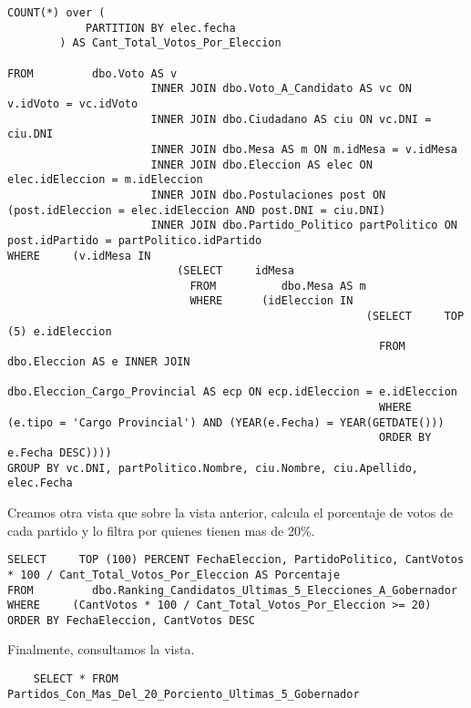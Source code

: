\begin{enumerate}
\begin{lstlisting}
COUNT(*) over (
	        PARTITION BY elec.fecha
	    ) AS Cant_Total_Votos_Por_Eleccion  

FROM         dbo.Voto AS v 
                      INNER JOIN dbo.Voto_A_Candidato AS vc ON v.idVoto = vc.idVoto 
                      INNER JOIN dbo.Ciudadano AS ciu ON vc.DNI = ciu.DNI 
                      INNER JOIN dbo.Mesa AS m ON m.idMesa = v.idMesa 
                      INNER JOIN dbo.Eleccion AS elec ON elec.idEleccion = m.idEleccion
                      INNER JOIN dbo.Postulaciones post ON (post.idEleccion = elec.idEleccion AND post.DNI = ciu.DNI)
                      INNER JOIN dbo.Partido_Politico partPolitico ON post.idPartido = partPolitico.idPartido
WHERE     (v.idMesa IN
                          (SELECT     idMesa
                            FROM          dbo.Mesa AS m
                            WHERE      (idEleccion IN
                                                       (SELECT     TOP (5) e.idEleccion
                                                         FROM          dbo.Eleccion AS e INNER JOIN
                                                                                dbo.Eleccion_Cargo_Provincial AS ecp ON ecp.idEleccion = e.idEleccion
                                                         WHERE      (e.tipo = 'Cargo Provincial') AND (YEAR(e.Fecha) = YEAR(GETDATE()))
                                                         ORDER BY e.Fecha DESC))))
GROUP BY vc.DNI, partPolitico.Nombre, ciu.Nombre, ciu.Apellido, elec.Fecha
\end{lstlisting}

Creamos otra vista que sobre la vista anterior, calcula el porcentaje de votos de cada partido y lo filtra por quienes tienen mas de 20\%.

\begin{lstlisting}
SELECT     TOP (100) PERCENT FechaEleccion, PartidoPolitico, CantVotos * 100 / Cant_Total_Votos_Por_Eleccion AS Porcentaje
FROM         dbo.Ranking_Candidatos_Ultimas_5_Elecciones_A_Gobernador
WHERE     (CantVotos * 100 / Cant_Total_Votos_Por_Eleccion >= 20)
ORDER BY FechaEleccion, CantVotos DESC
\end{lstlisting}

Finalmente, consultamos la vista.

\begin{lstlisting}
	SELECT * FROM Partidos_Con_Mas_Del_20_Porciento_Ultimas_5_Gobernador
\end{lstlisting}

\end{enumerate}